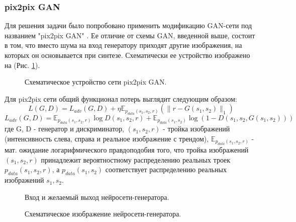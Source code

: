 		\subsubsection{pix2pix GAN}
			Для решения задачи было попробовано применить модификацию GAN-сети под названием "pix2pix GAN" \cite{p2p}. Ее отличие от схемы GAN, введенной выше, состоит в том, что вместо шума на вход генератору приходят другие изображения, на которых он основывается при синтезе. Схематически ее устройство изображено на (Рис. \ref{p2p}).
			\begin{figure}
				\centering{\texttt{[image: p2p]}}
				\caption{Схематическое устройство сети pix2pix GAN.}
				\label{p2p}
			\end{figure}
			Для pix2pix сети общий функционал потерь выглядит следующим образом: $$ L(G, D) = L_{adv}(G, D) + \eta \mathbb{E}_{p_{data}(s_1, s_2, r)} (\parallel r - G(s_1, s_2) \parallel_1)$$
			$$ L_{adv}(G, D) = \mathbb{E}_{p_{data}(s_1, s_2, r)}\log D(s_1, s_2, r) +  \mathbb{E}_{p_{data}(s_1, s_2)} \log (1 - D(s_1, s_2, G(s_1, s_2)))$$
			где G, D - генератор и дискриминатор, $(s_1, s_2, r)$ - тройка изображений (интенсивность слева, справа и реальное изображение с трендом),  $\mathbb{E}_{p_{data}(s_1, s_2, r)}$ - мат. ожидание логарифмического правдоподобия того, что тройка изображений $(s_1, s_2, r)$ принадлежит вероятностному распределению реальных троек $p_{data}(s_1, s_2, r)$, а $p_{data}(s_1, s_2)$ соответствует распределению реальных изображений $s_1, s_2$.
			\begin{figure}
				\caption{Вход и желаемый выход нейросети-генератора.}
				\label{p2p-gen}
			\end{figure}
			\begin{figure}
				\caption{Схематическое изображение нейросети-генератора.}
				\label{unet-sheme}
			\end{figure}
